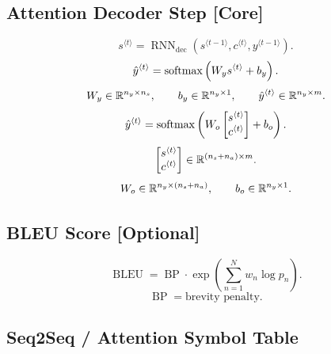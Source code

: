 \subsection{Attention Decoder Step \textbf{[Core]}}

\[
s^{\langle t\rangle}
=
\operatorname{RNN}_{\mathrm{dec}}
\left(
s^{\langle t-1\rangle},
c^{\langle t\rangle},
y^{\langle t-1\rangle}
\right).
\]
\[
\hat{y}^{\langle t\rangle}
=
\operatorname{softmax}
\left(
W_y s^{\langle t\rangle}
+
b_y
\right).
\]
\[
W_y \in \mathbb{R}^{n_y \times n_s},
\qquad
b_y \in \mathbb{R}^{n_y \times 1},
\qquad
\hat{y}^{\langle t\rangle}
\in
\mathbb{R}^{n_y \times m}.
\]
\[
\hat{y}^{\langle t\rangle}
=
\operatorname{softmax}
\left(
W_o
\begin{bmatrix}
s^{\langle t\rangle}\\
c^{\langle t\rangle}
\end{bmatrix}
+
b_o
\right).
\]
\[
\begin{bmatrix}
s^{\langle t\rangle}\\
c^{\langle t\rangle}
\end{bmatrix}
\in
\mathbb{R}^{(n_s+n_a)\times m}.
\]
\[
W_o \in \mathbb{R}^{n_y \times (n_s+n_a)},
\qquad
b_o \in \mathbb{R}^{n_y \times 1}.
\]

\subsection{BLEU Score \textbf{[Optional]}}

\[
\operatorname{BLEU}
=
\operatorname{BP}
\cdot
\exp
\left(
\sum_{n=1}^{N}
w_n \log p_n
\right).
\]
\[
\operatorname{BP}
=
\text{brevity penalty}.
\]

\subsection{Seq2Seq / Attention Symbol Table}

